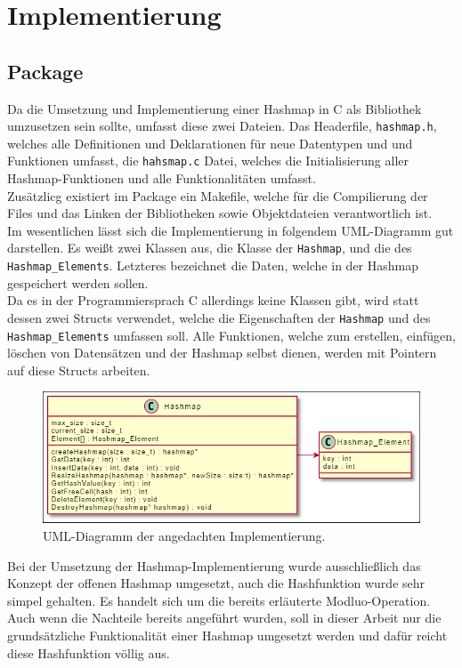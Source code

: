 \documentclass[11pt,a4paper]{article}
\begin{document}
\section{Implementierung}
\subsection{Package}
Da die Umsetzung und Implementierung einer Hashmap in C als Bibliothek umzusetzen sein sollte, umfasst diese zwei Dateien.
Das Headerfile, \lstinline{hashmap.h}, welches alle Definitionen und Deklarationen für neue Datentypen und und Funktionen umfasst, die 
\lstinline{hahsmap.c} Datei, welches die Initialisierung aller Hashmap-Funktionen und alle Funktionalitäten umfasst.\\
Zusätzlicg existiert im Package ein Makefile, welche für die Compilierung der Files und das Linken der Bibliotheken sowie Objektdateien 
verantwortlich ist.\\
Im wesentlichen lässt sich die Implementierung in folgendem UML-Diagramm gut darstellen. Es weißt zwei Klassen aus, die Klasse der \lstinline{Hashmap}, 
und die des \lstinline{Hashmap_Elements}. Letzteres bezeichnet die Daten, welche in der Hashmap gespeichert werden sollen.\\
Da es in der Programmiersprach C allerdings keine Klassen gibt, wird statt dessen zwei Structs verwendet, welche die Eigenschaften der 
\lstinline{Hashmap} und des \lstinline{Hashmap_Elements} umfassen soll. Alle Funktionen, welche zum erstellen, einfügen, löschen von Datensätzen und der Hashmap selbst dienen, werden 
mit Pointern auf diese Structs arbeiten.\\

\begin{figure}[t]
    \centering
    \includegraphics[scale=0.5]{Bilder/UML.PNG}
    \caption[Bild 1:]{UML-Diagramm der angedachten Implementierung.}
     
\end{figure}

Bei der Umsetzung der Hashmap-Implementierung wurde ausschließlich das Konzept der offenen Hashmap umgesetzt, auch die Hashfunktion wurde sehr simpel gehalten.
Es handelt sich um die bereits erläuterte Modluo-Operation.\\
Auch wenn die Nachteile bereits angeführt wurden, soll in dieser Arbeit nur die grundsätzliche Funktionalität 
einer Hashmap umgesetzt werden und dafür reicht diese Hashfunktion völlig aus.\\
\end{document}
